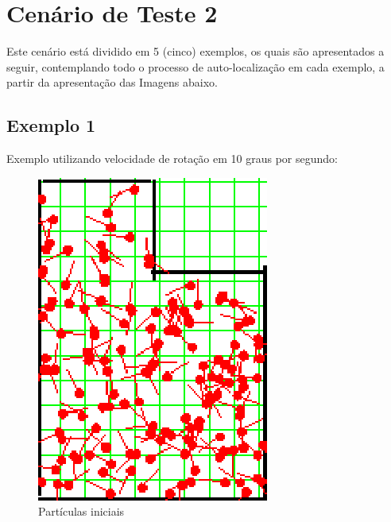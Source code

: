 \section{Cenário de Teste 2}

Este cenário está dividido em 5 (cinco) exemplos, os quais são apresentados a seguir, contemplando todo o processo de auto-localização
em cada exemplo, a partir da apresentação das Imagens abaixo.

\subsection{Exemplo 1}

Exemplo utilizando velocidade de rotação em 10 graus por segundo:

\begin{figure}[H]
  \centering
  \includegraphics[scale=1]{figuras/cen2_ex1/1.eps}
  \caption[Partículas Iniciais]{Partículas iniciais}
  \label{img:cen2_ex1_1}
\end{figure}

